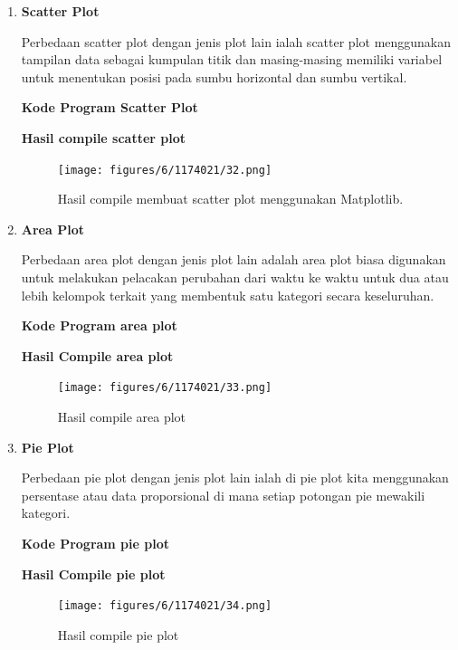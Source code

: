 \begin{enumerate}
	\item \textbf{Scatter Plot}
	
	Perbedaan scatter plot dengan jenis plot lain ialah scatter plot menggunakan tampilan data sebagai kumpulan titik dan masing-masing memiliki variabel untuk menentukan posisi pada sumbu horizontal dan sumbu vertikal.
	
	\textbf{Kode Program Scatter Plot}
	
	
	
	\textbf{Hasil compile scatter plot}
	
	\begin{figure}[H]
		\texttt{[image: figures/6/1174021/32.png]}
		\centering
		\caption{Hasil compile membuat scatter plot menggunakan Matplotlib.}
	\end{figure}
	
	\item \textbf{Area Plot}
	
	Perbedaan area plot dengan jenis plot lain adalah area plot biasa digunakan untuk melakukan pelacakan perubahan dari waktu ke waktu untuk dua atau lebih kelompok terkait yang membentuk satu kategori secara keseluruhan.
	
	\textbf{Kode Program area plot}
	
	
	
	\textbf{Hasil Compile area plot}
	
	\begin{figure}[H]
		\texttt{[image: figures/6/1174021/33.png]}
		\centering
		\caption{Hasil compile area plot}
	\end{figure}
	
	\item \textbf{Pie Plot}
	
	Perbedaan pie plot dengan jenis plot lain ialah di pie plot kita menggunakan persentase atau data proporsional di mana setiap potongan pie mewakili kategori.
	
	\textbf{Kode Program pie plot}
	
	
	
	\textbf{Hasil Compile pie plot}
	
	\begin{figure}[H]
		\texttt{[image: figures/6/1174021/34.png]}
		\centering
		\caption{Hasil compile pie plot}
	\end{figure}
	

\end{enumerate}
